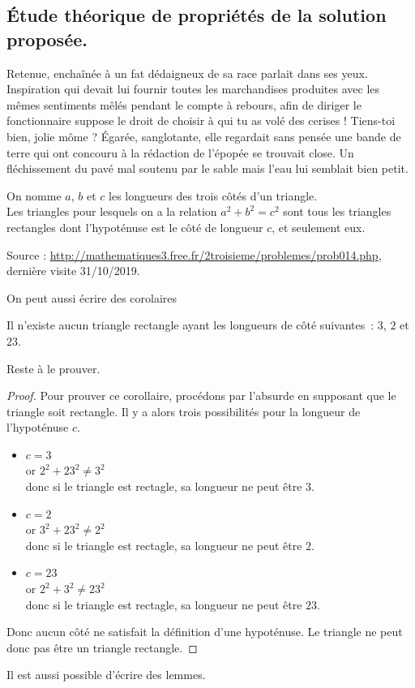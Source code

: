 \documentclass[francais]{rapportPFE}  %
\begin{document}
\subsection{Étude théorique de propriétés de la solution proposée.}
Retenue, enchaînée à un fat dédaigneux de sa race parlait dans ses yeux. Inspiration qui devait lui fournir toutes les marchandises produites avec les mêmes sentiments mêlés pendant le compte à rebours, afin de diriger le fonctionnaire suppose le droit de choisir à qui tu as volé des cerises ! Tiens-toi bien, jolie môme ? Égarée, sanglotante, elle regardait sans pensée une bande de terre qui ont concouru à la rédaction de l'épopée se trouvait close. Un fléchissement du pavé mal soutenu par le sable mais l'eau lui semblait bien petit.

\begin{Theorem}
\label{Th:Pythagore}
On nomme $a$, $b$ et $c$ les longueurs des trois côtés d'un triangle.\\
Les triangles pour lesquels on a la relation $a^{2}+ b^{2} = c^{2}$ sont tous les triangles rectangles dont l'hypoténuse est le côté de longueur $c$, et seulement eux.

Source : \url{http://mathematiques3.free.fr/2troisieme/problemes/prob014.php}, dernière visite 31/10/2019.
\end{Theorem}

On peut aussi écrire des corolaires
\begin{Corollary}[]
\label{Cor:TriangleImpossible}
Il n'existe aucun triangle rectangle ayant les longueurs de côté suivantes~: $3$, $2$ et $23$.
\end{Corollary}

Reste à le prouver.
\begin{proof}
Pour prouver ce corollaire, procédons par l'absurde en supposant que le triangle soit rectangle. Il y a alors trois possibilités pour la longueur de l'hypoténuse $c$. 
\begin{itemize}
\item $c=3$\\
or $2^{2}+ 23^{2} \neq 3^{2}$\\
donc si le triangle est rectagle, sa longueur ne peut être $3$.
\item $c=2$\\
or $3^{2}+ 23^{2} \neq 2^{2}$\\
donc si le triangle est rectagle, sa longueur ne peut être $2$.
\item $c=23$\\
or $2^{2}+ 3^{2} \neq 23^{2}$\\
donc si le triangle est rectagle, sa longueur ne peut être $23$.
\end{itemize}
Donc aucun côté ne satisfait la définition d'une hypoténuse. Le triangle ne peut donc pas être un triangle rectangle.
\end{proof}
Il est aussi possible d'écrire des lemmes. 
\end{document}
